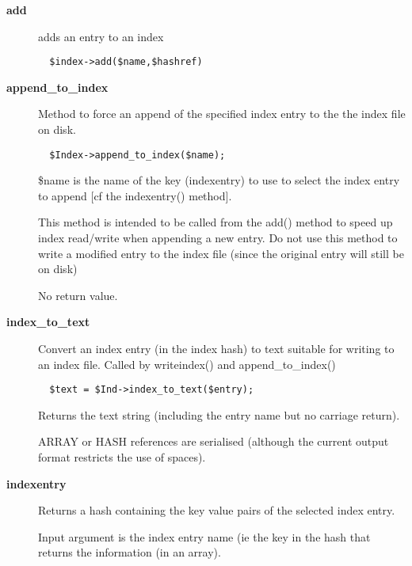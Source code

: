 \begin{description}
\begin{description}
\begin{description}
\item[{\textbf{add}}] \mbox{}

adds an entry to an index

\begin{verbatim}
  $index->add($name,$hashref)
\end{verbatim}

\item[{\textbf{append\_to\_index}}] \mbox{}

Method to force an append of the specified index entry to the
the index file on disk.

\begin{verbatim}
  $Index->append_to_index($name);
\end{verbatim}


\$name is the name of the key (indexentry) to use to select the
index entry to append [cf the indexentry() method].



This method is intended to be called from the add() method
to speed up index read/write when appending a new entry.
Do not use this method to write a modified entry to the
index file (since the original entry will still be on disk)



No return value.


\item[{\textbf{index\_to\_text}}] \mbox{}

Convert an index entry (in the index hash) to text suitable for
writing to an index file. Called by writeindex() and append\_to\_index()

\begin{verbatim}
  $text = $Ind->index_to_text($entry);
\end{verbatim}


Returns the text string (including the entry name but no carriage
return).



ARRAY or HASH references are serialised (although the current output
format restricts the use of spaces).


\item[{\textbf{indexentry}}] \mbox{}

Returns a hash containing the key value pairs of the
selected index entry.



Input argument is the index entry name (ie the key in the hash
that returns the information (in an array).




\end{description}
\end{description}
\end{description}
